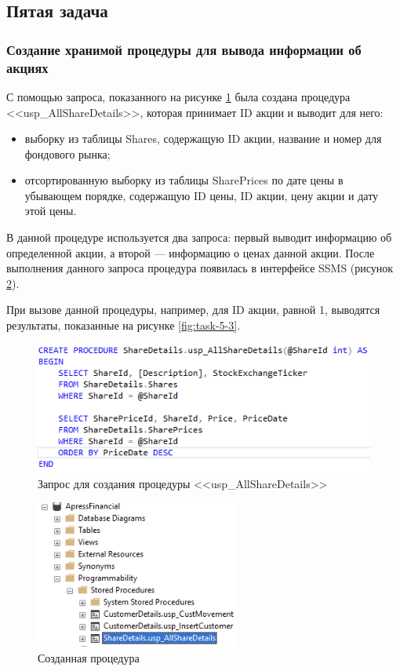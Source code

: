 \documentclass[a4paper, 14pt]{extarticle}
\begin{document}
\subsection{Пятая задача}

\subsubsection{Создание хранимой процедуры для вывода информации об акциях}

С помощью запроса, показанного на рисунке \ref{fig:task-5-1} была создана
процедура <<\foreignlanguage{english}{usp\_AllShareDetails}>>, которая принимает
ID акции и выводит для него:
\begin{itemize}
  \item выборку из таблицы Shares, содержащую ID акции, название и номер для
  фондового рынка;
  \item отсортированную выборку из таблицы SharePrices по дате цены в убывающем
  порядке, содержащую ID цены, ID акции, цену акции и дату этой цены.
\end{itemize}
В данной процедуре используется два запроса: первый выводит информацию об
определенной акции, а второй --- информацию о ценах данной акции. После
выполнения данного запроса процедура появилась в интерфейсе SSMS (рисунок
\ref{fig:task-5-2}).

При вызове данной процедуры, например, для ID акции, равной 1, выводятся
результаты, показанные на рисунке \ref{fig:task-5-3}.

\begin{figure}[H]
  \centering
  \includegraphics[width=\textwidth]{images/task-5/1.png}
  \caption{
    Запрос для создания процедуры
    <<\foreignlanguage{english}{usp\_AllShareDetails}>>
  }
  \label{fig:task-5-1}
\end{figure}

\begin{figure}[H]
  \centering
  \includegraphics[width=0.6\textwidth]{images/task-5/2.png}
  \caption{Созданная процедура}
  \label{fig:task-5-2}
\end{figure}
\end{document}
